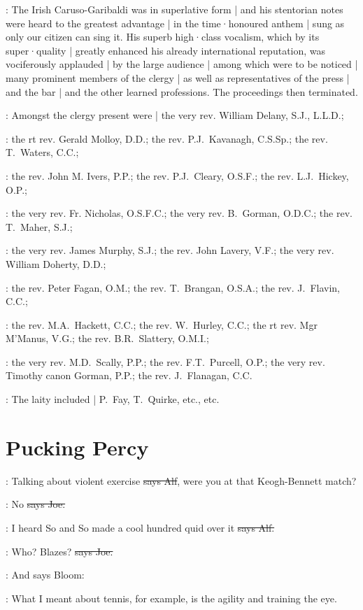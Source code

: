 :
The Irish Caruso-Garibaldi was in superlative form
 |
and his stentorian notes were heard to the greatest advantage |
in the time·honoured anthem |
sung as only our citizen can sing it.
His superb high·class vocalism,
which by its super·quality |
greatly enhanced his already international reputation,
was vociferously applauded |
by the large audience |
among which were to be noticed |
many prominent members of the clergy |
as well as representatives of the press |
and the bar |
and the other learned professions.
The proceedings then terminated.

:
Amongst the clergy present were |
the very rev. William Delany, S.J., L.L.D.;

:
the rt rev. Gerald Molloy, D.D.;
the rev. P.J.~Kavanagh, C.S.Sp.;
the rev. T.~Waters, C.C.;

:
the rev. John M. Ivers, P.P.;
the rev. P.J.~Cleary, O.S.F.;
the rev. L.J.~Hickey, O.P.;

:
the very rev. Fr. Nicholas, O.S.F.C.;
the very rev. B.~Gorman, O.D.C.;
the rev. T.~Maher, S.J.;

:
the very rev. James Murphy, S.J.;
the rev. John Lavery, V.F.;
the very rev. William Doherty, D.D.;

:
the rev. Peter Fagan, O.M.;
the rev. T.~Brangan, O.S.A.;
the rev. J.~Flavin, C.C.;

:
the rev. M.A.~Hackett, C.C.;
the rev. W.~Hurley, C.C.;
the rt rev. Mgr M'Manus, V.G.;
the rev. B.R.~Slattery, O.M.I.;

:
the very rev. M.D.~Scally, P.P.;
the rev. F.T.~Purcell, O.P.;
the very rev. Timothy canon Gorman, P.P.;
the rev. J.~Flanagan, C.C.

:
The laity included |
P.~Fay,
T.~Quirke,
etc.,
etc.


\section{Pucking Percy}

\bergan:
Talking about violent exercise
\sout{says Alf},
were you at that Keogh-Bennett match?

\joe:
No
\sout{says Joe.}

\bergan:
I heard So and So made a cool hundred quid over it
\sout{says Alf.}

\joe:
Who?
Blazes?
\sout{says Joe.}

\Nq:
And says Bloom:

\Bloom:
What I meant about tennis,
for example,
is the agility and training the eye.

